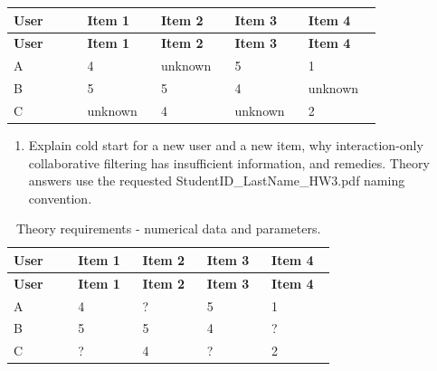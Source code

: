 \documentclass[11pt,a4paper]{article}
\begin{document}
\begingroup\small\setlength{\tabcolsep}{3pt}\renewcommand{\arraystretch}{1.2}
\begin{longtable}{@{}p{0.1760\linewidth}p{0.1760\linewidth}p{0.1760\linewidth}p{0.1760\linewidth}p{0.1760\linewidth}@{}}
\toprule
\textbf{User} & \textbf{Item 1} & \textbf{Item 2} & \textbf{Item 3} & \textbf{Item 4} \\ \midrule
\endfirsthead
\textbf{User} & \textbf{Item 1} & \textbf{Item 2} & \textbf{Item 3} & \textbf{Item 4} \\ \midrule \endhead
A & 4 & unknown & 5 & 1 \\
B & 5 & 5 & 4 & unknown \\
C & unknown & 4 & unknown & 2 \\
\bottomrule\end{longtable}\endgroup

\begin{enumerate}

\item Explain cold start for a new user and a new item, why interaction-only collaborative filtering has insufficient information, and remedies. Theory answers use the requested StudentID\_\allowbreak{}LastName\_\allowbreak{}HW3.pdf naming convention.

\end{enumerate}
\begingroup\small\setlength{\tabcolsep}{3pt}\renewcommand{\arraystretch}{1.18}\begin{longtable}{@{}p{0.1720\linewidth}p{0.1720\linewidth}p{0.1720\linewidth}p{0.1720\linewidth}p{0.1720\linewidth}@{}}
\caption{Theory requirements - numerical data and parameters.}\label{tab:rar_HW3_p010_table10}\\\toprule
\textbf{User} & \textbf{Item 1} & \textbf{Item 2} & \textbf{Item 3} & \textbf{Item 4} \\ \midrule\endfirsthead \textbf{User} & \textbf{Item 1} & \textbf{Item 2} & \textbf{Item 3} & \textbf{Item 4} \\ \midrule\endhead
A & 4 & ? & 5 & 1 \\
B & 5 & 5 & 4 & ? \\
C & ? & 4 & ? & 2 \\
\bottomrule\end{longtable}\endgroup
\clearpage
\end{document}
